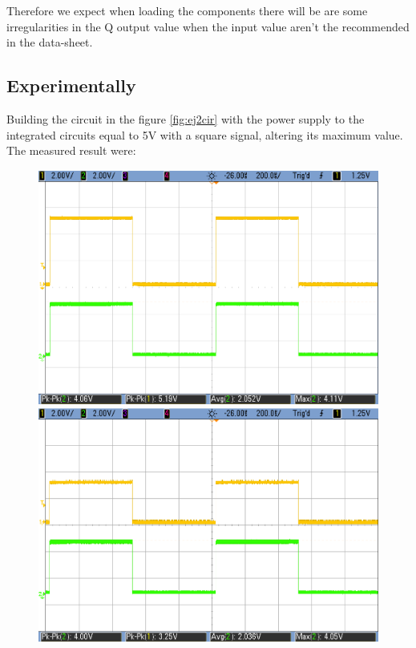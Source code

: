 	\pagebreak
	
	Therefore we expect when loading the components there will be are some irregularities in the Q output value when the input value aren't the recommended in the data-sheet. 

	\subsection{\color{purple}Experimentally}
	
	Building the circuit in the figure \ref{fig:ej2cir} with the power supply to the integrated circuits equal to 5V with a square signal, altering its maximum value. The measured result were:
	
	\begin{figure}[h!]
        \centering
        \includegraphics[scale=0.19]{HC-LS-5V.png}\hspace{1cm}
        \includegraphics[scale=0.19]{HC-LS-3V.png}\\

\end{figure}
